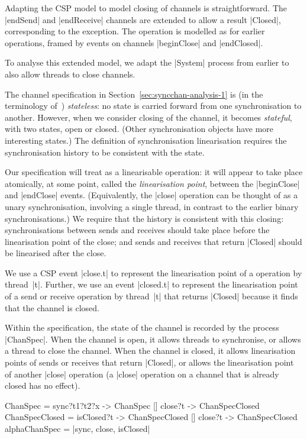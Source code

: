 
\inlineCSP

Adapting the CSP model to model closing of channels is straightforward.  The
|endSend| and |endReceive| channels are extended to allow a result |Closed|,
corresponding to the  exception.  The  operation is
modelled as for earlier operations, framed by events on channels |beginClose|
and |endClosed|.


To analyse this extended model, we adapt the |System| process from earlier to
also allow threads to close channels.  

The channel specification in Section~\ref{sec:syncchan-analysis-1} is (in the
terminology of~\cite{LL:synchronisation}) \emph{stateless}: no state is
carried forward from one synchronisation to another.  However, when we
consider closing of the channel, it becomes \emph{stateful}, with two states,
open or closed.  (Other synchronisation objects have more interesting states.)
The definition of synchronisation linearisation requires the synchronisation
history to be consistent with the state. 

Our specification will treat  as a linearisable operation: it
will appear to take place atomically, at some point, called the
\emph{linearisation point}, between the |beginClose| and |endClose| events.
(Equivalently, the |close| operation can be thought of as a unary
synchronisation, involving a single thread, in contrast to the earlier binary
synchronisations.)  We require that the history is consistent with this
closing: synchronisations between sends and receives should take place before
the linearisation point of the close; and sends and receives that return
|Closed| should be linearised after the close.

We use a CSP event |close.t| to represent the linearisation point of a
 operation by thread~|t|.  Further, we use an event |closed.t| to
represent the linearisation point of a send or receive operation by thread~|t|
that returns |Closed| because it finds that the channel is closed.

Within the specification, the state of the channel is recorded by the process
|ChanSpec|.  When the channel is open, it allows threads to synchronise, or
allows a thread to close the channel.  When the channel is closed, it allows
linearisation points of sends or receives that return |Closed|, or allows the
linearisation point of another |close| operation (a |close| operation on a
channel that is already closed has no effect).
%
\begin{cspm}
ChanSpec = sync?t1?t2?x -> ChanSpec [] close?t -> ChanSpecClosed
ChanSpecClosed = isClosed?t -> ChanSpecClosed [] close?t -> ChanSpecClosed
alphaChanSpec = {|sync, close, isClosed|} 
\end{cspm}


